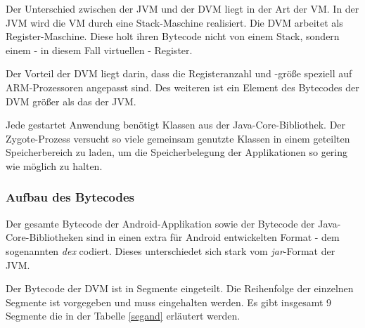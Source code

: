  Der Unterschied zwischen der JVM und der DVM liegt in der Art der VM. In der JVM wird die VM durch eine Stack-Maschine realisiert. Die DVM arbeitet als Register-Maschine. Diese holt ihren Bytecode nicht von einem Stack, sondern einem - in diesem Fall virtuellen - Register.
 
 Der Vorteil der DVM liegt darin, dass die Registeranzahl und -größe speziell auf ARM-Prozessoren angepasst sind. Des weiteren ist ein Element des Bytecodes der DVM größer als das der JVM.
 
 Jede gestartet Anwendung benötigt Klassen aus der Java-Core-Bibliothek. Der Zygote-Prozess versucht so viele gemeinsam genutzte Klassen in einem geteilten Speicherbereich zu laden, um die Speicherbelegung der Applikationen so gering wie möglich zu halten.
 
\subsubsection{Aufbau des Bytecodes}

Der gesamte Bytecode der Android-Applikation sowie der Bytecode der Java-Core-Bibliotheken sind in einen extra für Android entwickelten Format - dem sogenannten \textit{dex} codiert. Dieses unterschiedet sich stark vom \textit{jar}-Format der JVM.

Der Bytecode der DVM ist in Segmente eingeteilt. Die Reihenfolge der einzelnen Segmente ist vorgegeben und muss eingehalten werden. Es gibt insgesamt 9 Segmente die in der Tabelle \ref{segand} erläutert werden.

